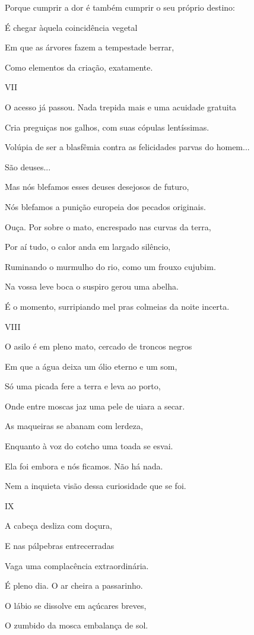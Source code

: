 Porque cumprir a dor é também cumprir o seu próprio destino:

É chegar àquela coincidência vegetal

Em que as árvores fazem a tempestade berrar,

Como elementos da criação, exatamente.

VII

O acesso já passou. Nada trepida mais e uma acuidade gratuita

Cria preguiças nos galhos, com suas cópulas lentíssimas.

Volúpia de ser a blasfêmia contra as felicidades parvas do homem...

São deuses...

Mas nós blefamos esses deuses desejosos de futuro,

Nós blefamos a punição europeia dos pecados originais.

Ouça. Por sobre o mato, encrespado nas curvas da terra,

Por aí tudo, o calor anda em largado silêncio,

Ruminando o murmulho do rio, como um frouxo cujubim.

Na vossa leve boca o suspiro gerou uma abelha.

É o momento, surripiando mel pras colmeias da noite incerta.

VIII

O asilo é em pleno mato, cercado de troncos negros

Em que a água deixa um ólio eterno e um som,

Só uma picada fere a terra e leva ao porto,

Onde entre moscas jaz uma pele de uiara a secar.

As maqueiras se abanam com lerdeza,

Enquanto à voz do cotcho uma toada se esvai.

Ela foi embora e nós ficamos. Não há nada.

Nem a inquieta visão dessa curiosidade que se foi.

IX

A cabeça desliza com doçura,

E nas pálpebras entrecerradas

Vaga uma complacência extraordinária.

É pleno dia. O ar cheira a passarinho.

O lábio se dissolve em açúcares breves,

O zumbido da mosca embalança de sol.

